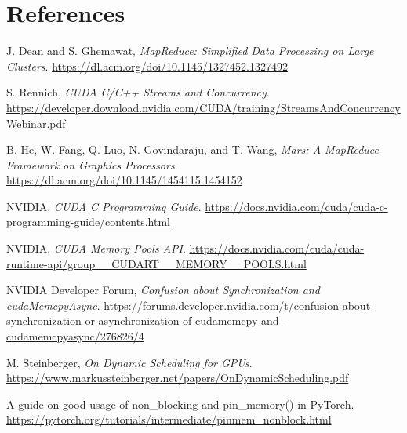 \documentclass{article}
\begin{document}
\section{References}
\begin{thebibliography}
\raggedright

J. Dean and S. Ghemawat, \textit{MapReduce: Simplified Data Processing on Large Clusters}. \href{https://dl.acm.org/doi/10.1145/1327452.1327492}{https://dl.acm.org/doi/10.1145/1327452.1327492}

S. Rennich, \textit{CUDA C/C++ Streams and Concurrency}. \href{https://developer.download.nvidia.com/CUDA/training/StreamsAndConcurrencyWebinar.pdf}{https://developer.download.nvidia.com/CUDA/training/StreamsAndConcurrencyWebinar.pdf}

B. He, W. Fang, Q. Luo, N. Govindaraju, and T. Wang, \textit{Mars: A MapReduce Framework on Graphics Processors}. \href{https://dl.acm.org/doi/10.1145/1454115.1454152}{https://dl.acm.org/doi/10.1145/1454115.1454152}

NVIDIA, \textit{CUDA C Programming Guide}. \href{https://docs.nvidia.com/cuda/cuda-c-programming-guide/contents.html}{https://docs.nvidia.com/cuda/cuda-c-programming-guide/contents.html}

NVIDIA, \textit{CUDA Memory Pools API}. \href{https://docs.nvidia.com/cuda/cuda-runtime-api/group__CUDART__MEMORY__POOLS.html}{https://docs.nvidia.com/cuda/cuda-runtime-api/group\_\_CUDART\_\_MEMORY\_\_POOLS.html}

NVIDIA Developer Forum, \textit{Confusion about Synchronization and cudaMemcpyAsync}. \href{https://forums.developer.nvidia.com/t/confusion-about-synchronization-or-asynchronization-of-cudamemcpy-and-cudamemcpyasync/276826/4}{https://forums.developer.nvidia.com/t/confusion-about-synchronization-or-asynchronization-of-cudamemcpy-and-cudamemcpyasync/276826/4}

M. Steinberger, \textit{On Dynamic Scheduling for GPUs}. \href{https://www.markussteinberger.net/papers/OnDynamicScheduling.pdf}{https://www.markussteinberger.net/papers/OnDynamicScheduling.pdf}

A guide on good usage of non\_blocking and pin\_memory() in PyTorch. \href{https://pytorch.org/tutorials/intermediate/pinmem_nonblock.html}{https://pytorch.org/tutorials/intermediate/pinmem\_nonblock.html}


\end{thebibliography}
\end{document}
